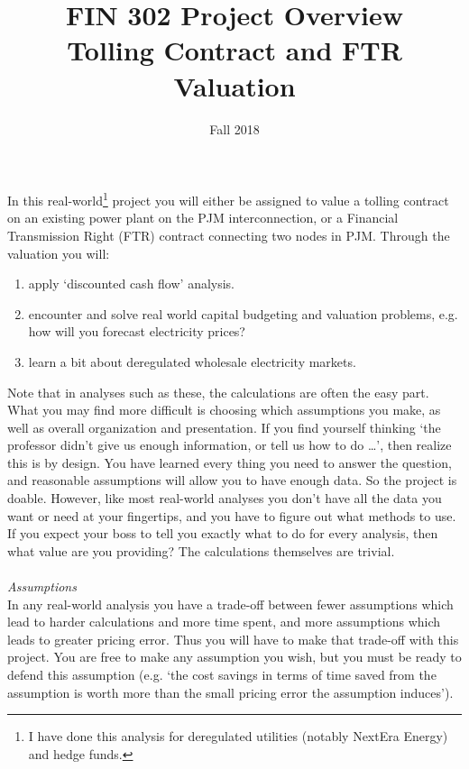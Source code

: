\documentclass{article}
\title{FIN 302 Project Overview\\
Tolling Contract and FTR Valuation }
\date{Fall 2018}
\begin{document}
\maketitle
\noindent In this real-world\footnote{I have done this analysis for deregulated utilities (notably NextEra Energy) and hedge funds.} project you will either be assigned to value a tolling contract on an existing power plant on the PJM interconnection, or a Financial Transmission Right (FTR) contract connecting two nodes in PJM.  Through the valuation you will:
\begin{enumerate}
\item apply `discounted cash flow' analysis.
\item encounter and solve real world capital budgeting and valuation problems, e.g. how will you forecast electricity prices?
\item learn a bit about deregulated wholesale electricity markets.  
\end{enumerate}
Note that in analyses such as these, the calculations are often the easy part.  What you may find more difficult is choosing which assumptions you make, as well as overall organization and presentation.  If you find yourself thinking `the professor didn't give us enough information, or tell us how to do \dots ',  then realize this is by design.  You have learned every thing you need to answer the question, and reasonable assumptions will allow you to have enough data.  So the project is doable.   However, like most real-world analyses you don't have all the data you want or need at your fingertips, and you have to figure out what methods to use.  If you expect your boss to tell you exactly what to do for every analysis, then what value are you providing?  The calculations themselves are trivial.\\
\\
{\it Assumptions}\\
In any real-world analysis you have a trade-off between fewer assumptions which lead to harder calculations and more time spent, and more assumptions which leads to greater pricing error.  Thus you will have to make that trade-off with this project.  You are free to make any assumption you wish, but you must be ready to defend this assumption (e.g. `the cost savings in terms of time saved from the assumption is worth more than the small pricing error the assumption induces').      \\
\end{document}
